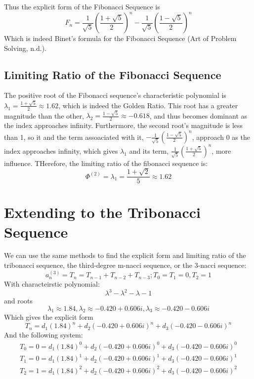 \documentclass[11pt]{article}
\begin{document}
Thus the explicit form of the Fibonacci Sequence is
    \[F_n=\frac{1}{\sqrt{5}}\left(\frac{1+\sqrt{5}}{2}\right)^n-\frac{1}{\sqrt{5}}\left(\frac{1-\sqrt{5}}{2}\right)^n\]
Which is indeed Binet's formula for the Fibonacci Sequence (Art of Problem Solving, n.d.).

\subsection{Limiting Ratio of the Fibonacci Sequence}
The positive root of the Fibonacci sequence's characteristic polynomial is $\lambda_1=\frac{1+\sqrt{5}}{2}\approx 1.62$, which is indeed the Golden Ratio. This root has a greater magnitude than the other, $\lambda_2=\frac{1-\sqrt{5}}{2}\approx-0.618$, and thus becomes dominant as the index approaches infinity. Furthermore, the second root's magnitude is less than 1, so it and the term assoaciated with it, \(-\frac{1}{\sqrt{5}}\left(\frac{1-\sqrt{5}}{2}\right)^n\), approach 0 as the index approaches infinity, which gives \(\lambda_1\) and its term, \(\frac{1}{\sqrt{5}}\left(\frac{1+\sqrt{5}}{2}\right)^n\), more influence. THerefore, the limiting ratio of the fibonacci sequence is:
\[\Phi^{(2)}=\lambda_1=\frac{1+\sqrt{2}}{5}\approx1.62\]



\section{Extending to the Tribonacci Sequence}
We can use the same methods to find the explicit form and limiting ratio of the tribonacci sequence, the third-degree m-nacci sequence, or the 3-nacci sequence:
$$a_{n}^{(3)}=T_n=T_{n-1}+T_{n-2}+T_{n-3};T_0=T_1=0, T_2=1$$
With characteirstic polynomial:
\[\lambda^3-\lambda^2-\lambda-1\]
and roots
\[\lambda_1 \approx 1.84, \lambda_2 \approx -0.420 + 0.606i, \lambda_3 \approx -0.420 - 0.606i\]
Which gives the explicit form
\[T_n=d_1(1.84)^n+d_2(-0.420 + 0.606i)^n+d_3(-0.420 - 0.606i)^n\]
And the following system:
\begin{align*}
    T_0=0=d_1(1.84)^0+d_2(-0.420 + 0.606i)^0+d_3(-0.420 - 0.606i)^0 \\
    T_1=0=d_1(1.84)^1+d_2(-0.420 + 0.606i)^1+d_3(-0.420 - 0.606i)^1 \\
    T_2=1=d_1(1.84)^2+d_2(-0.420 + 0.606i)^2+d_3(-0.420 - 0.606i)^2
\end{align*}
\end{document}
